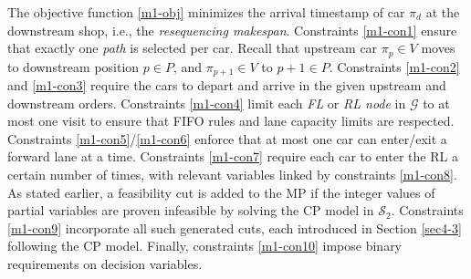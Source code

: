 \documentclass[12pt]{article}
\begin{document}
The objective function \eqref{m1-obj} minimizes the arrival timestamp of car $\pi_d$ at the downstream shop, i.e., the \textit{resequencing makespan}. Constraints \eqref{m1-con1} ensure that exactly one \textit{path} is selected per car.
Recall that upstream car $\pi_p\in V$ moves to downstream position $p\in P$, and $\pi_{p+1}\in V$ to $p+1\in P$. %
Constraints \eqref{m1-con2} and \eqref{m1-con3} require the cars to depart and arrive in the given upstream and downstream orders. Constraints \eqref{m1-con4} limit each \textit{FL} or \textit{RL node} in $\mathcal{G}$ to at most one visit to ensure that FIFO rules and lane capacity limits are respected. Constraints \eqref{m1-con5}/\eqref{m1-con6} enforce that at most one car can enter/exit a forward lane at a time. Constraints \eqref{m1-con7} require each car to enter the RL a certain number of times, with relevant variables linked by constraints \eqref{m1-con8}. As stated earlier, a feasibility cut is added to the MP if the integer values of partial variables are proven infeasible by solving the CP model in $\mathcal{S}_2$. Constraints \eqref{m1-con9} incorporate all such generated cuts, each introduced in Section \ref{sec4-3} following the CP model. Finally, constraints \eqref{m1-con10} impose binary requirements on decision variables.





\end{document}
